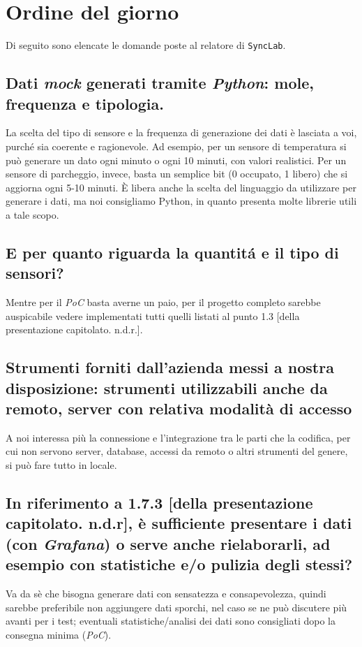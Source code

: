 \section{Ordine del giorno}
Di seguito sono elencate le domande poste al relatore di \texttt{SyncLab}.
\subsection{Dati \textit{mock} generati tramite \textit{Python}: mole, frequenza e tipologia.}
La scelta del tipo di sensore e la frequenza di generazione dei dati è lasciata a voi, purché sia coerente e ragionevole. Ad esempio, per un sensore di temperatura si può generare un dato ogni minuto o ogni 10 minuti, con valori realistici. Per un sensore di parcheggio, invece, basta un semplice bit (0 occupato, 1 libero) che si aggiorna ogni 5-10 minuti. È libera anche la scelta del linguaggio da utilizzare per generare i dati, ma noi consigliamo Python, in quanto presenta molte librerie utili a tale scopo.
\subsection{E per quanto riguarda la quantitá e il tipo di sensori?}
Mentre per il \textit{PoC} basta averne un paio, per il progetto completo sarebbe auspicabile vedere implementati tutti quelli listati al punto 1.3 [della presentazione capitolato. n.d.r.].
\subsection{Strumenti forniti dall'azienda messi a nostra disposizione: strumenti utilizzabili anche da remoto, server con relativa modalità di accesso}
A noi interessa più la connessione e l'integrazione tra le parti che la codifica, per cui non servono server, database, accessi da remoto o altri strumenti del genere, si può fare tutto in locale.
\subsection{In riferimento a 1.7.3 [della presentazione capitolato. n.d.r], è sufficiente presentare i dati (con \textit{Grafana}) o serve anche rielaborarli, ad esempio con statistiche e/o pulizia degli stessi?}
Va da sè che bisogna generare dati con sensatezza e consapevolezza, quindi sarebbe preferibile non aggiungere dati sporchi, nel caso se ne può discutere più avanti per i test; eventuali statistiche/analisi dei dati sono consigliati dopo la consegna minima (\textit{PoC}).
